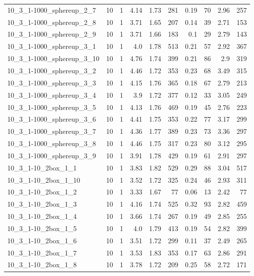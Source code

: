 \begin{center}
\begin{scriptsize}
\begin{longtable}{lrrrrrrrrr}
10\_3\_1-1000\_sphereup\_2\_7 & 10 & 1 & 4.14 & 1.73 & 281 & 0.19 & 70 & 2.96 & 257\\
10\_3\_1-1000\_sphereup\_2\_8 & 10 & 1 & 3.71 & 1.65 & 207 & 0.14 & 39 & 2.71 & 153\\
10\_3\_1-1000\_sphereup\_2\_9 & 10 & 1 & 3.71 & 1.66 & 183 & 0.1 & 29 & 2.79 & 143\\
10\_3\_1-1000\_sphereup\_3\_1 & 10 & 1 & 4.0 & 1.78 & 513 & 0.21 & 57 & 2.92 & 367\\
10\_3\_1-1000\_sphereup\_3\_10 & 10 & 1 & 4.76 & 1.74 & 399 & 0.21 & 86 & 2.9 & 319\\
10\_3\_1-1000\_sphereup\_3\_2 & 10 & 1 & 4.46 & 1.72 & 353 & 0.23 & 68 & 3.49 & 315\\
10\_3\_1-1000\_sphereup\_3\_3 & 10 & 1 & 4.15 & 1.76 & 365 & 0.18 & 67 & 2.79 & 213\\
10\_3\_1-1000\_sphereup\_3\_4 & 10 & 1 & 3.9 & 1.72 & 377 & 0.12 & 33 & 3.05 & 249\\
10\_3\_1-1000\_sphereup\_3\_5 & 10 & 1 & 4.13 & 1.76 & 469 & 0.19 & 45 & 2.76 & 223\\
10\_3\_1-1000\_sphereup\_3\_6 & 10 & 1 & 4.41 & 1.75 & 353 & 0.22 & 77 & 3.17 & 299\\
10\_3\_1-1000\_sphereup\_3\_7 & 10 & 1 & 4.36 & 1.77 & 389 & 0.23 & 73 & 3.36 & 297\\
10\_3\_1-1000\_sphereup\_3\_8 & 10 & 1 & 4.46 & 1.75 & 317 & 0.23 & 80 & 3.12 & 295\\
10\_3\_1-1000\_sphereup\_3\_9 & 10 & 1 & 3.91 & 1.78 & 429 & 0.19 & 61 & 2.91 & 297\\
10\_3\_1-10\_2box\_1\_1 & 10 & 1 & 3.83 & 1.82 & 529 & 0.29 & 88 & 3.04 & 517\\
10\_3\_1-10\_2box\_1\_10 & 10 & 1 & 3.52 & 1.72 & 325 & 0.24 & 46 & 2.93 & 311\\
10\_3\_1-10\_2box\_1\_2 & 10 & 1 & 3.33 & 1.67 & 77 & 0.06 & 13 & 2.42 & 77\\
10\_3\_1-10\_2box\_1\_3 & 10 & 1 & 4.16 & 1.74 & 525 & 0.32 & 93 & 2.82 & 459\\
10\_3\_1-10\_2box\_1\_4 & 10 & 1 & 3.66 & 1.74 & 267 & 0.19 & 49 & 2.85 & 255\\
10\_3\_1-10\_2box\_1\_5 & 10 & 1 & 4.0 & 1.79 & 413 & 0.19 & 54 & 2.82 & 399\\
10\_3\_1-10\_2box\_1\_6 & 10 & 1 & 3.51 & 1.72 & 299 & 0.11 & 37 & 2.49 & 265\\
10\_3\_1-10\_2box\_1\_7 & 10 & 1 & 3.53 & 1.83 & 353 & 0.17 & 63 & 2.86 & 291\\
10\_3\_1-10\_2box\_1\_8 & 10 & 1 & 3.78 & 1.72 & 209 & 0.25 & 58 & 2.72 & 171\\

\end{longtable}
\end{scriptsize}
\end{center}
